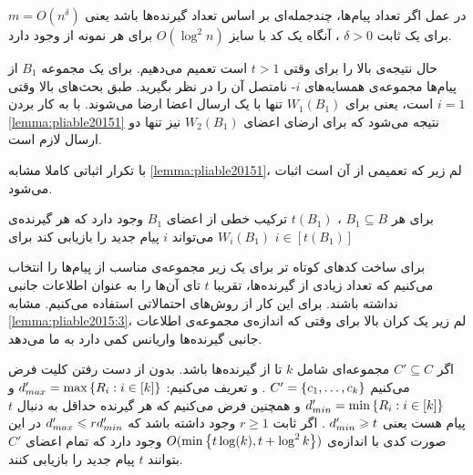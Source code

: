 \begin{corollary}
در عمل اگر تعداد پیام‌ها، چندجمله‌ای بر اساس تعداد گیرنده‌ها باشد یعنی
$m = O(n^{\delta})$
برای یک ثابت
$\delta > 0$
، آنگاه یک کد با سایز
$O(\log^2 n)$
برای هر نمونه از
وجود دارد.
\end{corollary}

حال نتیجه‌ی بالا را برای 
وقتی
$t > 1$
است تعمیم می‌دهیم. برای یک مجموعه
$B_1$
از پیام‌ها مجموعه‌ی همسایه‌های
$i$-
نامتصل آن را در نظر بگیرید. طبق بحث‌های بالا وقتی
$i = 1$
است، یعنی برای
$W_1(B_1)$
تنها با یک ارسال اعضا ارضا می‌شوند. با به کار بردن
\autoref{lemma:pliable20151}
نتیجه می‌شود که برای ارضای اعضای
$W_2(B_1)$
نیز تنها دو ارسال لازم است.

با تکرار اثباتی کاملا مشابه
\autoref{lemma:pliable20151}،
لم زیر که تعمیمی از آن است اثبات می‌شود.
\begin{lemma}
	برای هر
	$B_1 \subseteq B$
	، 
	$t(B_1)$
	ترکیب خطی از اعضای
	$B_1$
	وجود دارد که هر گیرنده‌ی
	$W_i(B_1)$
	می‌تواند
	$i$
	پیام جدید را بازیابی کند برای
	$i \in [t(B_1)]$
\end{lemma}
برای ساخت کدهای کوتاه تر برای
یک زیر مجموعه‌ی مناسب از پیام‌ها را انتخاب می‌کنیم که تعداد زیادی از گیرنده‌ها، تقریبا
$t$
تای آن‌ها را به عنوان اطلاعات جانبی نداشته باشند. برای این کار از روش‌های احتمالاتی استفاده می‌کنیم. مشابه
\autoref{lemma:pliable2015:3}،
لم زیر یک کران بالا برای وقتی که اندازه‌ی مجموعه‌ی اطلاعات جانبی گیرنده‌ها واریانس کمی دارد به ما می‌دهد.
\begin{lemma}
	\label{lemma:pliable2015:6}
	اگر
	$C' \subseteq C$
	مجموعه‌ای شامل 
	$k$
	تا از گیرنده‌‌ها باشد. بدون از دست رفتن کلیت فرض می‌کنیم
	$C' = \left\{ c_1, \ldots, c_k \right\}$
	. و تعریف می‌کنیم:
	$d_{max}' = \max\left\{ R_i: i \in [k]  \right\}$
	و
	$d_{min}' = \min\left\{ R_i: i \in [k]  \right\}$
	و همچنین فرض می‌کنیم که هر گیرنده حداقل به دنبال 
	$t$
	پیام هست یعنی
	$d_{min}' \geqslant t$
	. اگر ثابت
	$r \geq 1$
	وجود داشته باشد که
	$d_{max}' \leqslant r d_{min}'$
	در این صورت کدی با اندازه‌ی
	$O(\min\left\{ t \log(k), t + \log^2 k \right\})$
	وجود دارد که تمام اعضای
	$C'$
	بتوانند
	$t$
	پیام جدید را بازیابی کنند.
\end{lemma}
